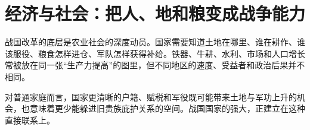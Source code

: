 \section{经济与社会：把人、地和粮变成战争能力}

战国改革的底层是农业社会的深度动员。国家需要知道土地在哪里、谁在耕作、谁该服役、粮食怎样进仓、军队怎样获得补给。铁器、牛耕、水利、市场和人口增长常被放在同一张“生产力提高”的图里，但不同地区的速度、受益者和政治后果并不相同。

对普通家庭而言，国家更清晰的户籍、赋税和军役既可能带来土地与军功上升的机会，也意味着更少能躲进旧贵族庇护关系的空间。战国国家的强大，正建立在这种直接联系上。
